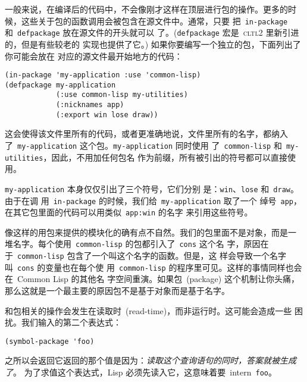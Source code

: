 一般来说，在编译后的代码中，不会像刚才这样在顶层进行包的操作。更多的时
候，这些关于包的函数调用会被包含在源文件中。通常，只要
把~\texttt{in-package} 和~\texttt{defpackage} 放在源文件的开头就可以
了。(\texttt{defpackage} 宏是~\textsc{cltl}2 里新引进的，但是有些较老的
实现也提供了它。) 如果你要编写一个独立的包，下面列出了你可能会放在
对应的源文件最开始地方的代码：
\begin{verbatim}
(in-package 'my-application :use 'common-lisp)
(defpackage my-application
            (:use common-lisp my-utilities)
            (:nicknames app)
            (:export win lose draw))
\end{verbatim}
这会使得该文件里所有的代码，或者更准确地说，文件里所有的名字，都纳入
了~\texttt{my-application} 这个包。\texttt{my-application} 同时使用
了~\texttt{common-lisp} 和~\texttt{my-utilities}，因此，不用加任何包名
作为前缀，所有被引出的符号都可以直接使用。

\texttt{my-application} 本身仅仅引出了三个符号，它们分别
是：\texttt{win}、\texttt{lose} 和~\texttt{draw}。由于在调
用~\texttt{in-package} 的时候，我们给~\texttt{my-application} 取了一个
绰号~\texttt{app}，在其它包里面的代码可以用类似~\texttt{app:win} 的名字
来引用这些符号。

像这样的用包来提供的模块化的确有点不自然。我们的包里面不是对象，而是一
堆名字。每个使用~\texttt{common-lisp} 的包都引入了~\texttt{cons} 这个名
字，原因在于~\texttt{common-lisp} 包含了一个叫这个名字的函数。但是，这
样会导致一个名字叫~\texttt{cons} 的变量也在每个使
用~\texttt{common-lisp} 的程序里可见。这样的事情同样也会在~Common Lisp 的其他名
字空间重演。如果包~(package) 这个机制让你头痛，那么这就是一个最主要的原因\pozhehao{}包不是基于对象而是基于名字。

和包相关的操作会发生在读取时~(read-time)，而非运行时。这可能会造成一些
困扰。我们输入的第二个表达式：
\begin{verbatim}
(symbol-package 'foo)
\end{verbatim}
之所以会返回它返回的那个值是因为：\emph{读取这个查询语句的同时，答案就被生成了}。
为了求值这个表达式，Lisp 必须先读入它，这意味着要~intern~\texttt{foo}。

